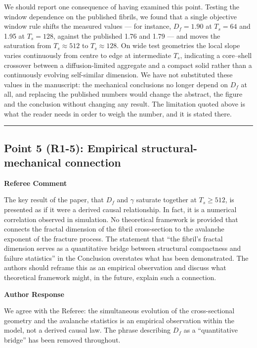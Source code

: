 \documentclass[11pt]{article}
\newenvironment{refereecomment}
  {%
    \par
    \begingroup
    \color{commentgray}
    \itshape
    \setlength{\leftskip}{1.4em}
    \setlength{\rightskip}{1.4em}
  }
  {%
    \par
    \endgroup
  }
\newcommand{\refereelabel}{%
  \par\smallskip
  {\color{commentgray}\bfseries Referee Comment}\par
}
\newcommand{\responselabel}{%
  \par\medskip
  {\color{responseblue}\bfseries Author Response}\par
}
\newcommand{\pointseparator}{%
  \par\bigskip
  {\color{rulegray}\hrule}
  \par\bigskip
}
\begin{document}
We should report one consequence of having examined this point. Testing the
window dependence on the published fibrils, we found that a single objective
window rule shifts the measured values --- for instance, $D_f=1.90$ at $T_s=64$
and 1.95 at $T_s=128$, against the published 1.76 and 1.79 --- and moves the
saturation from $T_s\approx512$ to $T_s\approx128$. On wide test geometries the
local slope varies continuously from centre to edge at intermediate $T_s$,
indicating a core--shell crossover between a diffusion-limited aggregate and a
compact solid rather than a continuously evolving self-similar dimension. We
have not substituted these values in the manuscript: the mechanical conclusions
no longer depend on $D_f$ at all, and replacing the published numbers would
change the abstract, the figure and the conclusion without changing any result.
The limitation quoted above is what the reader needs in order to weigh the
number, and it is stated there.


\pointseparator


\subsection*{Point 5 (R1-5): Empirical structural-mechanical connection}

\refereelabel
\begin{refereecomment}
  The key result of the paper, that \(D_f\) and \(\gamma\) saturate together at
  \(T_s\geq512\), is presented as if it were a derived causal relationship. In
  fact, it is a numerical correlation observed in simulation. No theoretical
  framework is provided that connects the fractal dimension of the fibril
  cross-section to the avalanche exponent of the fracture process. The statement
  that ``the fibril's fractal dimension serves as a quantitative bridge between
  structural compactness and failure statistics'' in the Conclusion overstates
  what has been demonstrated. The authors should reframe this as an empirical
  observation and discuss what theoretical framework might, in the future,
  explain such a connection.
\end{refereecomment}

\responselabel

We agree with the Referee: the simultaneous evolution of the cross-sectional
geometry and the avalanche statistics is an empirical observation within the
model, not a derived causal law. The phrase describing $D_f$ as a
``quantitative bridge'' has been removed throughout.
\end{document}

